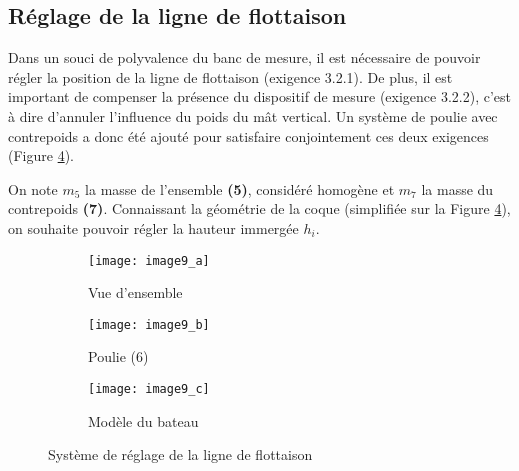 \ifprof
\begin{corrige}
\end{corrige}
\else
\fi

\subsection{Réglage de la ligne de flottaison}
Dans un souci de polyvalence du banc de mesure, il est nécessaire de pouvoir régler la position de la ligne de flottaison (exigence 3.2.1). De plus, il est important de compenser la présence du dispositif de mesure (exigence 3.2.2), c'est à dire d'annuler l'influence du poids du mât vertical. Un système de poulie avec contrepoids a donc été ajouté pour satisfaire conjointement ces deux exigences (Figure \ref{fig:CCMP:2021:09}).

On note $m_5$ la masse de l'ensemble \textbf{(5)}, considéré homogène et $m_7$ la masse du contrepoids \textbf{(7)}. Connaissant la géométrie de la coque (simplifiée sur la Figure \ref{fig:CCMP:2021:09}), on souhaite pouvoir régler la hauteur immergée $h_i$.

\begin{figure}[!h]
\centering
    \begin{subfigure}[b]{.3\textwidth}
    \centering
    \texttt{[image: image9\_a]}
    \caption{\label{fig:CCMP:2021:09:a}Vue d’ensemble }
    \end{subfigure}
    \begin{subfigure}[b]{.3\textwidth}
    \centering
    \texttt{[image: image9\_b]}
    \caption{\label{fig:CCMP:2021:09:b} Poulie (6)}
    \end{subfigure}
    \begin{subfigure}[b]{.3\textwidth}
    \centering
    \texttt{[image: image9\_c]}
    \caption{\label{fig:CCMP:2021:09:c} Modèle du bateau}
    \end{subfigure}
\caption{ \label{fig:CCMP:2021:09}Système de réglage de la ligne de flottaison}
\end{figure}


